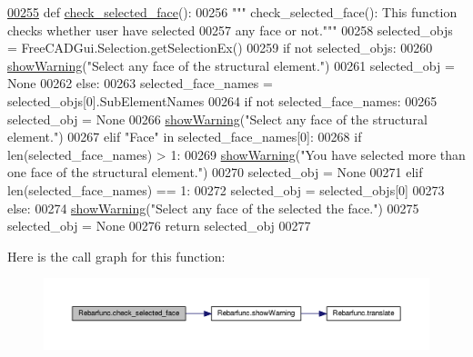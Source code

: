 \begin{DoxyCode}
\hypertarget{namespaceRebarfunc.tex_l00255}{}\hyperlink{namespaceRebarfunc_adae2713855a7e1b4bda04081ae671542}{00255} \textcolor{keyword}{def }\hyperlink{namespaceRebarfunc_adae2713855a7e1b4bda04081ae671542}{check\_selected\_face}():
00256     \textcolor{stringliteral}{""" check\_selected\_face(): This function checks whether user have selected}
00257 \textcolor{stringliteral}{        any face or not."""}
00258     selected\_objs = FreeCADGui.Selection.getSelectionEx()
00259     \textcolor{keywordflow}{if} \textcolor{keywordflow}{not} selected\_objs:
00260         \hyperlink{namespaceRebarfunc_a2278a0602d46a62953af1fcf2e574a94}{showWarning}(\textcolor{stringliteral}{"Select any face of the structural element."})
00261         selected\_obj = \textcolor{keywordtype}{None}
00262     \textcolor{keywordflow}{else}:
00263         selected\_face\_names = selected\_objs[0].SubElementNames
00264         \textcolor{keywordflow}{if} \textcolor{keywordflow}{not} selected\_face\_names:
00265             selected\_obj = \textcolor{keywordtype}{None}
00266             \hyperlink{namespaceRebarfunc_a2278a0602d46a62953af1fcf2e574a94}{showWarning}(\textcolor{stringliteral}{"Select any face of the structural element."})
00267         \textcolor{keywordflow}{elif} \textcolor{stringliteral}{"Face"} \textcolor{keywordflow}{in} selected\_face\_names[0]:
00268             \textcolor{keywordflow}{if} len(selected\_face\_names) > 1:
00269                 \hyperlink{namespaceRebarfunc_a2278a0602d46a62953af1fcf2e574a94}{showWarning}(\textcolor{stringliteral}{"You have selected more than one face of the structural element."})
00270                 selected\_obj = \textcolor{keywordtype}{None}
00271             \textcolor{keywordflow}{elif} len(selected\_face\_names) == 1:
00272                 selected\_obj = selected\_objs[0]
00273         \textcolor{keywordflow}{else}:
00274             \hyperlink{namespaceRebarfunc_a2278a0602d46a62953af1fcf2e574a94}{showWarning}(\textcolor{stringliteral}{"Select any face of the selected the face."})
00275             selected\_obj = \textcolor{keywordtype}{None}
00276     \textcolor{keywordflow}{return} selected\_obj
00277 
\end{DoxyCode}


Here is the call graph for this function\+:\nopagebreak
\begin{figure}[H]
\begin{center}
\leavevmode
\includegraphics[width=350pt]{namespaceRebarfunc_adae2713855a7e1b4bda04081ae671542_cgraph}
\end{center}
\end{figure}




